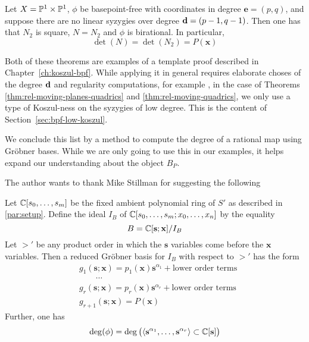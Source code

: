 \documentclass[fleqn,reqno]{amsart}
\begin{document}
\begin{theorem}
\label{thm:rel-moving-quadrics}
Let $X=\mathbb{P}^1\times\mathbb{P}^1$, $\phi$ be basepoint-free with coordinates in degree $\mathbf e=(p,q)$,
and suppose there are no linear syzygies over degree $\mathbf d=(p-1,q-1)$.
Then one has that $N_2$ is square, $N=N_2$ and $\phi$ is birational. In particular,
\[
	\det(N)=\det(N_2)=P(\mathbf x)
\]
\end{theorem}

\begin{paragraf*}
Both of these theorems are examples of a template proof described in Chapter~\ref{ch:koszul-bpf}.
While applying it in general requires elaborate choses of the degree $\mathbf d$ and
regularity computations, for example \citet{AHW-05},
in the case of Theorems \ref{thm:rel-moving-planes-quadrics} and \ref{thm:rel-moving-quadrics},
we only use a type of Koszul-ness on the syzygies of low degree.
This is the content of Section~\ref{sec:bpf-low-koszul}.
\end{paragraf*}



\begin{paragraf*}
We conclude this list by a method to compute the degree of a rational map using Gr\"{o}bner bases.
While we are only going to use this in our examples,
it helps expand our understanding about the object $B_P$.

The author wants to thank Mike Stillman for suggesting the following
\end{paragraf*}

\begin{proposition}
\label{prop:deg-GB}
Let $\mathbb{C}[s_0,\ldots,s_m]$ be the fixed ambient polynomial ring of $S'$ as described in
\eqref{par:setup}.
Define the ideal $I_B$ of $\mathbb{C}[s_0,\ldots,s_m;x_0,\ldots,x_n]$ by the equality
\[
	B=\mathbb{C}[\mathbf s;\mathbf x]/I_B
\]
Let $>'$ be any product order in which the $\mathbf s$ variables
come before the $\mathbf x$ variables.
Then a reduced Gr\"obner basis for $I_B$ with respect to $>'$ has the form
\begin{align*}
	&g_1(\mathbf s;\mathbf x)=p_1(\mathbf x){\mathbf s}^{\alpha_1}+\text{lower order terms}\\
	&\qquad\cdots\\
	&g_r(\mathbf s;\mathbf x)=p_r(\mathbf x){\mathbf s}^{\alpha_r}+\text{lower order terms}\\
	&g_{r+1}(\mathbf s;\mathbf x)=P(\mathbf x)
\end{align*}
Further, one has
\[
	\deg(\phi)=
	\deg \big(\langle{\mathbf s}^{\alpha_1},\ldots,{\mathbf s}^{\alpha_r}\rangle\subset\mathbb{C}[\mathbf s]\big)
\]
\end{proposition}





\end{document}
